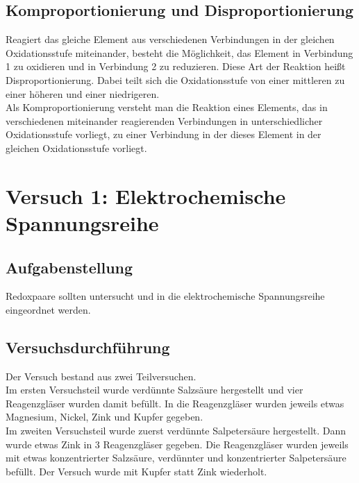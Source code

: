 \documentclass[12pt]{scrartcl} %
\begin{document}
\newpage


\subsection{Komproportionierung und Disproportionierung}
Reagiert das gleiche Element aus verschiedenen Verbindungen in der gleichen Oxidationsstufe miteinander, besteht die Möglichkeit, das Element in Verbindung 1 zu oxidieren und in Verbindung 2 zu reduzieren. Diese Art der Reaktion heißt Disproportionierung. Dabei teilt sich die Oxidationsstufe von einer mittleren zu einer höheren und einer niedrigeren.\\
Als Komproportionierung versteht man die Reaktion eines Elements, das in verschiedenen miteinander reagierenden Verbindungen in unterschiedlicher Oxidationsstufe vorliegt, zu einer Verbindung in der dieses Element in der gleichen Oxidationsstufe vorliegt.
\cite{skript}


\section{Versuch 1: Elektrochemische Spannungsreihe}
\subsection{Aufgabenstellung}
Redoxpaare sollten untersucht und in die elektrochemische Spannungsreihe eingeordnet werden.




\subsection{Versuchsdurchführung}
Der Versuch bestand aus zwei Teilversuchen.\\
Im ersten Versuchsteil wurde verdünnte Salzsäure hergestellt und vier Reagenzgläser wurden damit befüllt. In die Reagenzgläser wurden jeweils etwas Magnesium, Nickel, Zink und Kupfer gegeben.\\[2mm]
Im zweiten Versuchsteil wurde zuerst verdünnte Salpetersäure hergestellt. Dann wurde etwas Zink in 3 Reagenzgläser gegeben. Die Reagenzgläser wurden jeweils mit etwas konzentrierter Salzsäure, verdünnter und konzentrierter Salpetersäure befüllt. Der Versuch wurde mit Kupfer statt Zink wiederholt.
\end{document}
